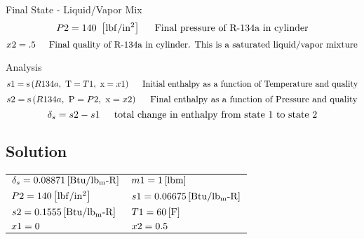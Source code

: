 \documentclass[10pt,fleqn]{article}
\newcommand{\F}[1]{\mbox{$#1$}}
\newcommand{\V}[1]{\mbox{$ #1 $}}
\newcommand{\I}{\mbox{\hspace{0.20in}}}
\newcommand{\entropy}{\mathrm{s}}
\begin{document}
\vspace{0.10in}
\noindent
\rm Final State - Liquid/Vapor Mix
\begin{equation}
\label{EES Eqn:4}
\V{P2} = 140   \   \left[ \rm lbf/in^{2} \right]			 
\mbox{\I Final pressure of R-134a in cylinder}
\end{equation}
\begin{equation}
\label{EES Eqn:5}
\V{x2} =.5					 
\mbox{\I Final quality of R-134a in cylinder. This is a saturated liquid/vapor mixture}
\end{equation}

\vspace{0.10in}
\noindent
\rm Analysis
\begin{equation}
\label{EES Eqn:6}
\V{s1} =\entropy \left(\F{R134a},\mbox{\ T}=\V{T1} ,\mbox{\ x}=\V{x1}  \right) 				 
\mbox{\I Initial enthalpy as a function of Temperature and quality}
\end{equation}
\begin{equation}
\label{EES Eqn:7}
\V{s2} =\entropy \left(\F{R134a},\mbox{\ P}=\V{P2} ,\mbox{\ x}=\V{x2}  \right) 				 
\mbox{\I Final enthalpy as a function of Pressure and quality}
\end{equation}
\begin{equation}
\label{EES Eqn:8}
{\delta }_{s}=\V{s2} -\V{s1						}  
\mbox{\I total change in enthalpy from state 1 to state 2}
\end{equation}

\subsection*{Solution}
\setlength\LTleft{0pt}
\setlength\LTright{0pt}
\begin{longtable}{ll}
${\delta _{s} =0.08871 \rm\left[Btu/lb_m \mbox{-} R\right]}$ & 
${\V{m1}  =1 \rm\left[lbm\right]}$ \\
${\V{P2}  =140 \rm\left[lbf/in^{2}\right]}$ & 
${\V{s1}  =0.06675 \rm\left[Btu/lb_m \mbox{-} R\right]}$ \\
${\V{s2}  =0.1555 \rm\left[Btu/lb_m \mbox{-} R\right]}$ & 
${\V{T1}  =60 \rm\left[F\right]}$ \\
${\V{x1}  =0 \rm}$ & 
${\V{x2}  =0.5 \rm}$\end{longtable}
\end{document}
